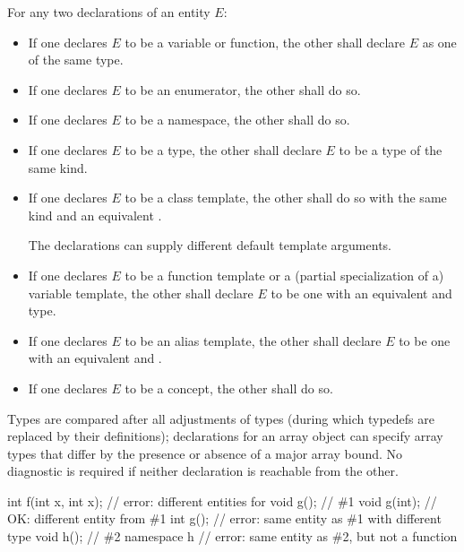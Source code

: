 \pnum
{}%
%
For any two declarations of an entity $E$:
\begin{itemize}
\item
If one declares $E$ to be a variable or function,
the other shall declare $E$ as one of the same type.
\item
If one declares $E$ to be an enumerator, the other shall do so.
\item
If one declares $E$ to be a namespace, the other shall do so.
\item
If one declares $E$ to be a type,
the other shall declare $E$ to be a type of the same kind.
\item
If one declares $E$ to be a class template,
the other shall do so with the same kind and
an equivalent .
\begin{note}
The declarations can supply different default template arguments.
\end{note}
\item
If one declares $E$ to be a function template or
a (partial specialization of a) variable template,
the other shall declare $E$ to be one
with an equivalent  and type.
\item
If one declares $E$ to be an alias template,
the other shall declare $E$ to be one with
an equivalent  and .
\item
If one declares $E$ to be a concept, the other shall do so.
\end{itemize}
Types are compared after all adjustments of types (during which
typedefs are replaced by their definitions);
declarations for an array
object can specify array types that differ by the presence or absence of
a major array bound.
No diagnostic is required if neither declaration is reachable from the other.
\begin{example}
\begin{codeblock}
int f(int x, int x);    // error: different entities for 
void g();               // \#1
void g(int);            // OK: different entity from \#1
int g();                // error: same entity as \#1 with different type
void h();               // \#2
namespace h {}          // error: same entity as \#2, but not a function
\end{codeblock}
\end{example}

